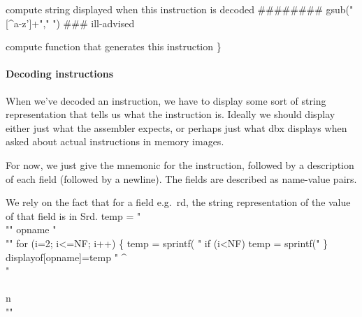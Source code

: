         \LA{}compute string displayed when this instruction is decoded\RA{}
########        gsub("[^a-z']+"," ")   ### ill-advised

        \LA{}compute function that generates this instruction\RA{}
\}

\endcode
{}
\paragraph{Decoding instructions}
When we've decoded an instruction, we have to display some sort of
string representation that tells us what the instruction is.
Ideally we should display either just what the assembler expects,
or perhaps just what dbx displays when asked about actual instructions
in memory images.

For now, we just give the mnemonic for the instruction, followed
by a description of each field (followed by a newline).
The fields are described as name-value pairs.

We rely on the fact that for a field e.g.\ \code{}rd\edoc{}, the string
representation of the value of that field is in \code{}Srd\edoc{}.
\enddocs
{}
\endmoddef
temp = "\\"" opname " \\""
for (i=2; i<=NF; i++) \{
        temp = sprintf( "%
        if (i<NF) temp = sprintf("%
\}
displayof[opname]=temp " ^ \\"\\\\n\\""

